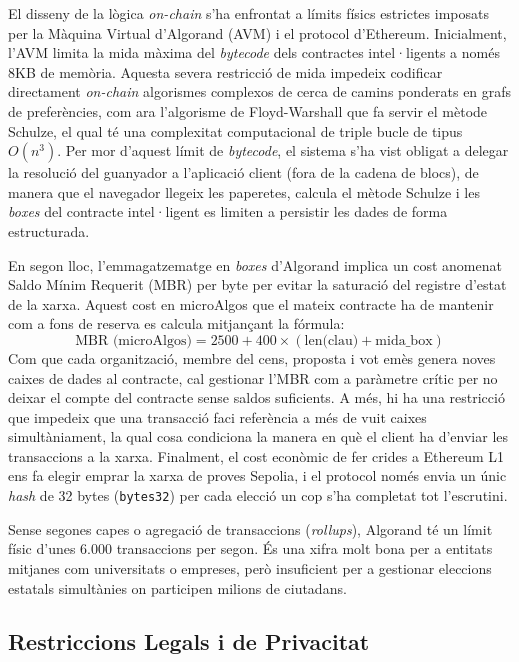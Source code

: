 El disseny de la lògica \textit{on-chain} s'ha enfrontat a límits físics estrictes imposats per la Màquina Virtual
d'Algorand (\ac{AVM}) i el protocol d'Ethereum.
Inicialment, l'\ac{AVM} limita la mida màxima del \textit{bytecode} dels contractes intel·ligents a només 8KB de
memòria.
Aquesta severa restricció de mida impedeix codificar directament \textit{on-chain} algorismes complexos de cerca de
camins ponderats en grafs de preferències, com ara l'algorisme de Floyd-Warshall que fa servir el mètode Schulze, el
qual té una complexitat computacional de triple bucle de tipus $O(n^3)$.
Per mor d'aquest límit de \textit{bytecode}, el sistema s'ha vist obligat a delegar la resolució del guanyador a
l'aplicació client (fora de la cadena de blocs), de manera que el navegador llegeix les paperetes, calcula el mètode
Schulze i les \textit{boxes} del contracte intel·ligent es limiten a persistir les dades de forma estructurada.

En segon lloc, l'emmagatzematge en \textit{boxes} d'Algorand implica un cost anomenat Saldo Mínim Requerit (MBR) per
byte per evitar la saturació del registre d'estat de la xarxa.
Aquest cost en microAlgos que el mateix contracte ha de mantenir com a fons de reserva es calcula mitjançant la fórmula:
\[ \text{MBR (microAlgos)} = 2500 + 400 \times (\text{len(clau)} + \text{mida\_box}) \]
Com que cada organització, membre del cens, proposta i vot emès genera noves caixes de dades al contracte, cal gestionar
l'MBR com a paràmetre crític per no deixar el compte del contracte sense saldos suficients.
A més, hi ha una restricció que impedeix que una transacció faci referència a més de vuit caixes simultàniament, la qual
cosa condiciona la manera en què el client ha d'enviar les transaccions a la xarxa.
Finalment, el cost econòmic de fer crides a Ethereum L1 ens fa elegir emprar la xarxa de proves Sepolia, 
i el protocol només envia un únic \textit{hash} de 32 bytes (\texttt{bytes32}) per cada elecció
un cop s'ha completat tot l'escrutini.

Sense segones capes o agregació de transaccions (\textit{rollups}), Algorand té un límit físic d'unes 6.000 transaccions
per segon.
És una xifra molt bona per a entitats mitjanes com universitats o empreses, però insuficient per a gestionar eleccions
estatals simultànies on participen milions de ciutadans.

\subsection{Restriccions Legals i de Privacitat}
\label{subsec:restriccions-legals}

